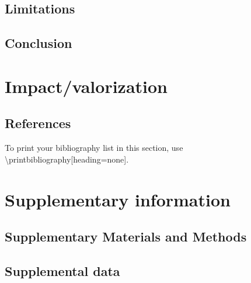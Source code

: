 \documentclass[11pt]{article}
\begin{document}
\subsection{Limitations}


\subsection{Conclusion}

\newpage
\section{Impact/valorization}


\newpage
\begin{adjustwidth}{1.5mm}{1.5mm}
\section{References}
\sloppy
To print your bibliography list in this section, use \textbackslash printbibliography[heading=none].

\end{adjustwidth}
\newpage



\section{Supplementary information}
\newpage
\setcounter{equation}{0}
\setcounter{figure}{0}
\setcounter{table}{0}
\makeatletter
\renewcommand{\theequation}{S\arabic{equation}}
\renewcommand{\thefigure}{S\arabic{figure}}
\renewcommand{\thetable}{S\arabic{table}}
\renewcommand{\thesubsection}{S\arabic{subsection}}
\renewcommand{\thepage}{\arabic{page}}

\subsection{Supplementary Materials and Methods}
\label{sec:Supplementary Materials and Methods}

\newpage
\subsection{Supplemental data}
\label{sec:Supplementary data}
\end{document}
